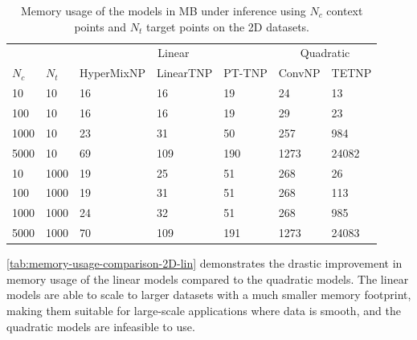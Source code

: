 \documentclass[../../main.tex]{subfiles}
\begin{document}
\begin{table}[H]
    \centering
    \begin{tabular}{@{}lllllll@{}}
    \toprule
    &  & \multicolumn{3}{c}{Linear} & \multicolumn{2}{c}{Quadratic} \\ \cmidrule(lr){3-5} \cmidrule(lr){6-7}
    $N_c$ & $N_t$  & HyperMixNP & LinearTNP & PT-TNP & ConvNP & TETNP \\ \midrule
    10     & 10    & 16         & 16        & 19     & 24     & 13    \\
    100    & 10    & 16         & 16        & 19     & 29     & 23    \\
    1000   & 10    & 23         & 31        & 50     & 257    & 984   \\
    5000   & 10    & 69         & 109       & 190    & 1273   & 24082 \\ \midrule
    10     & 1000  & 19         & 25        & 51     & 268    & 26    \\
    100    & 1000  & 19         & 31        & 51     & 268    & 113   \\
    1000   & 1000  & 24         & 32        & 51     & 268    & 985   \\
    5000   & 1000  & 70         & 109       & 191    & 1273   & 24083 \\ \bottomrule
    \end{tabular}
    \caption{Memory usage of the models in MB under inference using $N_c$ context points and $N_t$ target points on the 2D datasets.}
    \label{tab:memory-usage-comparison-2D-lin}
\end{table}
\FloatBarrier

\autoref{tab:memory-usage-comparison-2D-lin} demonstrates the drastic improvement in memory usage of the linear models compared to the quadratic models. The linear models are able to scale to larger datasets with a much smaller memory footprint, making them suitable for large-scale applications where data is smooth, and the quadratic models are infeasible to use. 



\ifSubfilesClassLoaded{%
    \printbibliography{}
}{} 
\end{document}
